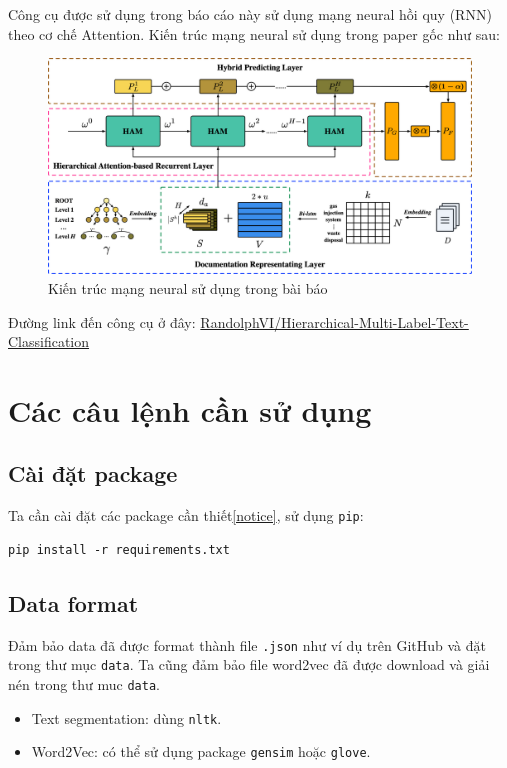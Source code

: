 \documentclass[12pt]{article}
\begin{document}
Công cụ được sử dụng trong báo cáo này sử dụng mạng neural hồi quy (RNN) theo cơ chế Attention. Kiến trúc mạng neural sử dụng trong paper gốc như sau:
\begin{figure}[H]
    \centering
    \includegraphics[scale=.25]{img/neural-structure.png}
    \caption{Kiến trúc mạng neural sử dụng trong bài báo\cite{huang2019hierarchical}}
    \label{fig:neural_structure}
\end{figure}

Đường link đến công cụ ở đây: \href{https://github.com/RandolphVI/Hierarchical-Multi-Label-Text-Classification}{RandolphVI/Hierarchical-Multi-Label-Text-Classification}

\section{Các câu lệnh cần sử dụng}
\subsection{Cài đặt package}
Ta cần cài đặt các package cần thiết\ref{notice}, sử dụng \texttt{pip}:
\begin{lstlisting}
pip install -r requirements.txt
\end{lstlisting}

\subsection{Data format}
Đảm bảo data đã được format thành file \texttt{.json} như ví dụ trên GitHub và đặt trong thư mục \texttt{data}. Ta cũng đảm bảo file word2vec đã được download và giải nén trong thư muc \texttt{data}.
\begin{itemize}
    \item Text segmentation: dùng \texttt{nltk}.
    \item Word2Vec: có thể sử dụng package \texttt{gensim} hoặc \texttt{glove}.
\end{itemize}
\end{document}
